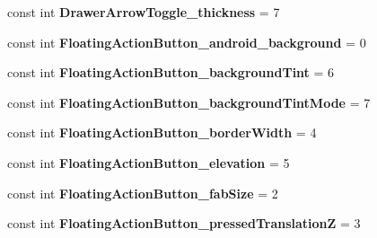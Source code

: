 \begin{DoxyCompactItemize}
\item 
\hypertarget{classClient_1_1Droid_1_1Resource_1_1Styleable_a53d1c4db44e4a960de9d53e4d3d21f61}{}const int {\bfseries Drawer\+Arrow\+Toggle\+\_\+thickness} = 7\label{classClient_1_1Droid_1_1Resource_1_1Styleable_a53d1c4db44e4a960de9d53e4d3d21f61}

\item 
\hypertarget{classClient_1_1Droid_1_1Resource_1_1Styleable_aa3dee5d085ddc74e15d2eac9d1639869}{}const int {\bfseries Floating\+Action\+Button\+\_\+android\+\_\+background} = 0\label{classClient_1_1Droid_1_1Resource_1_1Styleable_aa3dee5d085ddc74e15d2eac9d1639869}

\item 
\hypertarget{classClient_1_1Droid_1_1Resource_1_1Styleable_ab15ec0f4f4deab4d421f55394f3f12f3}{}const int {\bfseries Floating\+Action\+Button\+\_\+background\+Tint} = 6\label{classClient_1_1Droid_1_1Resource_1_1Styleable_ab15ec0f4f4deab4d421f55394f3f12f3}

\item 
\hypertarget{classClient_1_1Droid_1_1Resource_1_1Styleable_aceff2b4ac2f5b950762a0277f62037ae}{}const int {\bfseries Floating\+Action\+Button\+\_\+background\+Tint\+Mode} = 7\label{classClient_1_1Droid_1_1Resource_1_1Styleable_aceff2b4ac2f5b950762a0277f62037ae}

\item 
\hypertarget{classClient_1_1Droid_1_1Resource_1_1Styleable_a17d8778773e3e415a42982deeb36b452}{}const int {\bfseries Floating\+Action\+Button\+\_\+border\+Width} = 4\label{classClient_1_1Droid_1_1Resource_1_1Styleable_a17d8778773e3e415a42982deeb36b452}

\item 
\hypertarget{classClient_1_1Droid_1_1Resource_1_1Styleable_aca0d40a3c294dd276ff0f6e3a7b6605b}{}const int {\bfseries Floating\+Action\+Button\+\_\+elevation} = 5\label{classClient_1_1Droid_1_1Resource_1_1Styleable_aca0d40a3c294dd276ff0f6e3a7b6605b}

\item 
\hypertarget{classClient_1_1Droid_1_1Resource_1_1Styleable_aeb70c18d08ab94582a94f77591d219dc}{}const int {\bfseries Floating\+Action\+Button\+\_\+fab\+Size} = 2\label{classClient_1_1Droid_1_1Resource_1_1Styleable_aeb70c18d08ab94582a94f77591d219dc}

\item 
\hypertarget{classClient_1_1Droid_1_1Resource_1_1Styleable_acf3f430af69134aeb752295b07da02bf}{}const int {\bfseries Floating\+Action\+Button\+\_\+pressed\+Translation\+Z} = 3\label{classClient_1_1Droid_1_1Resource_1_1Styleable_acf3f430af69134aeb752295b07da02bf}


\end{DoxyCompactItemize}
